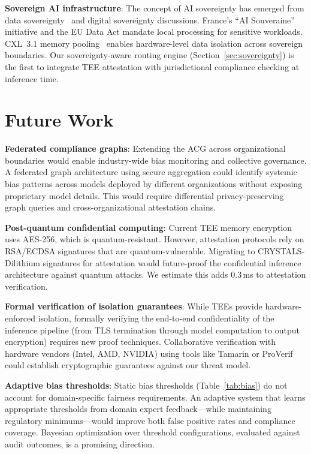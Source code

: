\documentclass[conference,10pt]{IEEEtran}
\begin{document}
\textbf{Sovereign AI infrastructure}: The concept of AI sovereignty has emerged from data sovereignty~\cite{jobin2023ai} and digital sovereignty discussions. France's ``AI Souveraine'' initiative and the EU Data Act mandate local processing for sensitive workloads. CXL~3.1 memory pooling~\cite{sun2024cxl} enables hardware-level data isolation across sovereign boundaries. Our sovereignty-aware routing engine (Section~\ref{sec:sovereignty}) is the first to integrate TEE attestation with jurisdictional compliance checking at inference time.

\section{Future Work}
\label{sec:future}

\textbf{Federated compliance graphs}: Extending the ACG across organizational boundaries would enable industry-wide bias monitoring and collective governance. A federated graph architecture using secure aggregation could identify systemic bias patterns across models deployed by different organizations without exposing proprietary model details. This would require differential privacy-preserving graph queries and cross-organizational attestation chains.

\textbf{Post-quantum confidential computing}: Current TEE memory encryption uses AES-256, which is quantum-resistant. However, attestation protocols rely on RSA/ECDSA signatures that are quantum-vulnerable. Migrating to CRYSTALS-Dilithium signatures for attestation would future-proof the confidential inference architecture against quantum attacks. We estimate this adds 0.3\,ms to attestation verification.

\textbf{Formal verification of isolation guarantees}: While TEEs provide hardware-enforced isolation, formally verifying the end-to-end confidentiality of the inference pipeline (from TLS termination through model computation to output encryption) requires new proof techniques. Collaborative verification with hardware vendors (Intel, AMD, NVIDIA) using tools like Tamarin or ProVerif could establish cryptographic guarantees against our threat model.

\textbf{Adaptive bias thresholds}: Static bias thresholds (Table~\ref{tab:bias}) do not account for domain-specific fairness requirements. An adaptive system that learns appropriate thresholds from domain expert feedback---while maintaining regulatory minimums---would improve both false positive rates and compliance coverage. Bayesian optimization over threshold configurations, evaluated against audit outcomes, is a promising direction.
\end{document}
